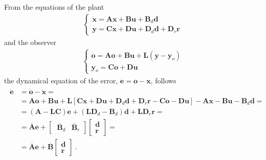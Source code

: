 \documentclass[letterpaper,10pt,english]{jupyterBook}
\begin{document}
\sphinxAtStartPar
From the equations of the plant
\begin{equation*}
\begin{split}\begin{cases}
 \dot{\mathbf{x}} = \mathbf{A} \mathbf{x} + \mathbf{B} \mathbf{u} + \mathbf{B}_d \mathbf{d} \\
 \mathbf{y}       = \mathbf{C} \mathbf{x} + \mathbf{D} \mathbf{u} + \mathbf{D}_d \mathbf{d} + \mathbf{D}_r \mathbf{r}
\end{cases}\end{split}
\end{equation*}
\sphinxAtStartPar
and the observer
\begin{equation*}
\begin{split}\begin{cases}
 \dot{\mathbf{o}} = \mathbf{A} \mathbf{o} + \mathbf{B} \mathbf{u} + \mathbf{L} \left( \mathbf{y} - \mathbf{y}_o \right) \\
 \mathbf{y}_o     = \mathbf{C} \mathbf{o} + \mathbf{D} \mathbf{u} 
\end{cases}\end{split}
\end{equation*}
\sphinxAtStartPar
the dynamical equation of the error, \(\mathbf{e} = \mathbf{o} - \mathbf{x}\), follows
\begin{equation*}
\begin{split}\begin{aligned}
  \dot{\mathbf{e}} 
  & = \dot{\mathbf{o}} - \dot{\mathbf{x}} = \\
  & = \mathbf{A} \mathbf{o} + \mathbf{B} \mathbf{u} + \mathbf{L} \left[ \mathbf{C} \mathbf{x} + \mathbf{D} \mathbf{u} + \mathbf{D}_d \mathbf{d} + \mathbf{D}_r \mathbf{r} - \mathbf{C} \mathbf{o} - \mathbf{D} \mathbf{u} \right] - \mathbf{A} \mathbf{x} - \mathbf{B} \mathbf{u} - \mathbf{B}_d \mathbf{d} = \\
  & = \left( \mathbf{A} - \mathbf{L} \mathbf{C} \right) \mathbf{e} + \left( \mathbf{L} \mathbf{D}_d - \mathbf{B}_d \right) \mathbf{d} + \mathbf{L} \mathbf{D}_r \mathbf{r} = \\
  & = \overline{\mathbf{A}} \mathbf{e} + \begin{bmatrix} \ \overline{\mathbf{B}}_d & \overline{\mathbf{B}}_r \end{bmatrix} \begin{bmatrix} \mathbf{d} \\ \mathbf{r} \end{bmatrix}  = \\
  & = \overline{\mathbf{A}} \mathbf{e} + \overline{\mathbf{B}} \begin{bmatrix} \mathbf{d} \\ \mathbf{r} \end{bmatrix} \ .
\end{aligned}\end{split}
\end{equation*}
\end{document}
